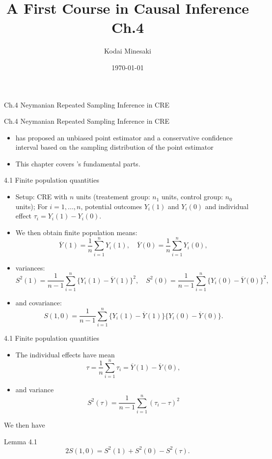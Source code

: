 \documentclass[aspectratio=169, 12pt]{beamer}
\title[]{A First Course in Causal Inference Ch.4}
\author[Kodai Minesaki]{Kodai Minesaki}
\institute[Faculty of Engineering, The University of Tokyo]{Faculty of Engineering, The University of Tokyo}
\date{\today}
\begin{document}
\begin{frame}
\titlepage
\end{frame}

\begin{frame}
  
  {
    \large
    
    Ch.4 Neymanian Repeated Sampling Inference in CRE
  }

\end{frame}

\begin{frame}{Ch.4 Neymanian Repeated Sampling Inference in CRE}
  \begin{itemize}
    \item \citet{neyman1923application} has proposed an unbiased point estimator and a conservative confidence interval based on the sampling distribution of the point estimator
    \item This chapter covers \citet{neyman1923application}'s fundamental parts.
  \end{itemize}
\end{frame}

\begin{frame}{4.1 Finite population quantities}
  \begin{itemize}
    \item Setup: CRE with $n$ units (treatement group: $n_1$ units, control group: $n_0$ units); For $i=1,...,n$, potential outcomes $Y_i(1)$ and $Y_i(0)$ and individual effect $\tau_i = Y_i(1)-Y_i(0)$.
    \item We then obtain finite population means:
    \[
    \overline{Y}(1) = \frac{1}{n}\sum_{i=1}^{n}Y_i(1), \quad \overline{Y}(0) = \frac{1}{n}\sum_{i=1}^{n}Y_i(0),
    \]
    \item variances:
    \[
    S^2(1) = \frac{1}{n-1}\sum_{i=1}^{n}\{Y_i(1)-\overline{Y}(1)\}^2, \quad S^2(0) = \frac{1}{n-1}\sum_{i=1}^{n}\{Y_i(0)-\overline{Y}(0)\}^2,
    \]
    \item and covariance:
    \[
    S(1,0) = \frac{1}{n-1}\sum_{i=1}^{n}\{Y_i(1)-\overline{Y}(1)\}\{Y_i(0)-\overline{Y}(0)\}.
    \]
  \end{itemize}
\end{frame}

\begin{frame}{4.1 Finite population quantities}
  \begin{itemize}
    \item The individual effects have mean
    \[
    \tau = \frac{1}{n}\sum_{i=1}^{n}\tau_i = \overline{Y}(1)-\overline{Y}(0), 
    \]
    \item and variance
    \[
    S^2(\tau) = \frac{1}{n-1}\sum_{i=1}^{n}(\tau_i-\tau)^2
    \]
  \end{itemize}
  We then have
  \begin{keybox}{Lemma 4.1}
    \[
    2S(1,0) = S^2(1)+S^2(0) - S^2(\tau).
    \]
  \end{keybox}
\end{frame}
\end{document}
